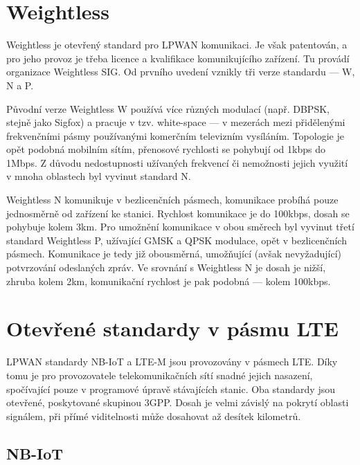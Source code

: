 
\section{Weightless}

Weightless je otevřený standard pro LPWAN komunikaci. Je však patentován, a pro 
jeho provoz je třeba licence a kvalifikace komunikujícího zařízení. Tu provádí 
organizace Weightless SIG. Od prvního uvedení vznikly tři verze standardu --- 
W, N a P.

Původní verze Weightless W používá více různých modulací (např. DBPSK, stejně 
jako Sigfox) a pracuje v tzv. white-space --- v mezerách mezi přidělenými 
frekvenčními pásmy používanými komerčním televizním vysíláním. Topologie je opět 
podobná 
mobilním sítím, přenosové rychlosti se pohybují od 1kbps do 1Mbps. Z důvodu 
nedostupnosti užívaných frekvencí či nemožnosti jejich využití v mnoha oblastech 
byl vyvinut standard N.

Weightless N komunikuje v bezlicenčních pásmech, komunikace probíhá pouze 
jednosměrně od zařízení ke stanici. Rychlost komunikace je do 100kbps, dosah se 
pohybuje kolem 3km. Pro umožnění komunikace v obou směrech byl vyvinut třetí 
standard Weightless P, užívající GMSK a QPSK modulace, opět v bezlicenčních 
pásmech. Komunikace je tedy již obousměrná, umožňující (avšak nevyžadující) 
potvrzování odeslaných zpráv. Ve srovnání s Weightless N je dosah je nižší, 
zhruba kolem 2km, komunikační rychlost je pak podobná --- kolem 100kbps.


\section{Otevřené standardy v pásmu LTE}

LPWAN standardy NB-IoT a LTE-M jsou provozovány v pásmech LTE. Díky tomu je pro 
provozovatele telekomunikačních sítí snadné jejich nasazení, spočívající pouze 
v programové úpravě stávajících stanic. Oba standardy jsou otevřené, poskytované
skupinou 3GPP. Dosah je velmi závislý na pokrytí oblasti signálem, při přímé
viditelnosti může dosahovat až desítek kilometrů.

\subsection{NB-IoT}

